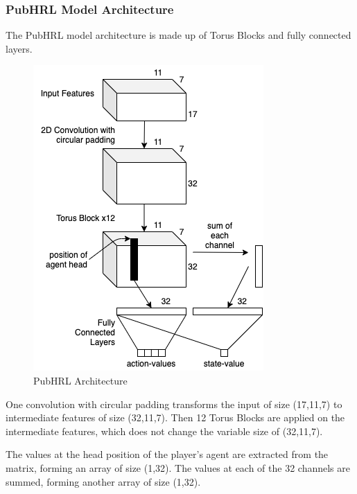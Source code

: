 
\subsubsection{PubHRL Model Architecture}

The PubHRL model architecture is made up of Torus Blocks and fully connected layers.

\begin{figure}[h!]
\centering
  \includegraphics[width=0.6\linewidth]{images/pubhrl-edit.png}
  \caption{PubHRL Architecture}
\end{figure}

One convolution with circular padding transforms the input of size (17,11,7) to intermediate features of size (32,11,7). Then 12 Torus Blocks are applied on the intermediate features, which does not change the variable size of (32,11,7).

The values at the head position of the player's agent are extracted from the matrix, forming an array of size (1,32). The values at each of the 32 channels are summed, forming another array of size (1,32).

